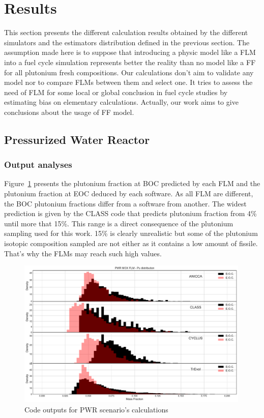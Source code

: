 
\section{Results}

This section presents the different calculation results obtained by the
different simulators and the estimators distribution defined in the previous
section.  The assumption made here is to suppose that introducing a physic model
like a \gls{FLM} into a fuel cycle simulation represents better the reality than
no model like a \gls{FF} for all plutonium fresh compositions. Our calculations
don't aim to validate any model nor to compare \gls{FLM}s between them and
select one. It tries to assess the need of \gls{FLM} for some local or global
conclusion in fuel cycle studies by estimating bias on elementary calculations.
Actually, our work aims to give conclusions about the usage of \gls{FF} model.   

\subsection{Pressurized Water Reactor}
\subsubsection{Output analyses}

Figure~\ref{fig:PWR_MOX_FLM_Pu} presents the plutonium fraction at \gls{BOC} predicted
by each \gls{FLM} and the plutonium fraction at \gls{EOC} deduced by each software. As all
FLM are different, the \gls{BOC} plutonium fractions differ from a software from
another. The widest prediction is given by the CLASS code that predicts plutonium
fraction from 4\% until more that 15\%. This range is a direct consequence of
the plutonium sampling used for this work. 15\% is clearly unrealistic but some
of the plutonium isotopic composition sampled are not either as it contains a low
amount of fissile. That's why the \gls{FLM}s may reach such high values.    

\begin{figure}[h]
	\begin{center}
		\includegraphics[width = 0.99\textwidth]{../../Feature_1/RAW_DATA/FIG/PWR_MOX_FLM_Pu.pdf}
		\caption{Code outputs for \gls{PWR} scenario's calculations}
		\label{fig:PWR_MOX_FLM_Pu}
	\end{center}
\end{figure}


